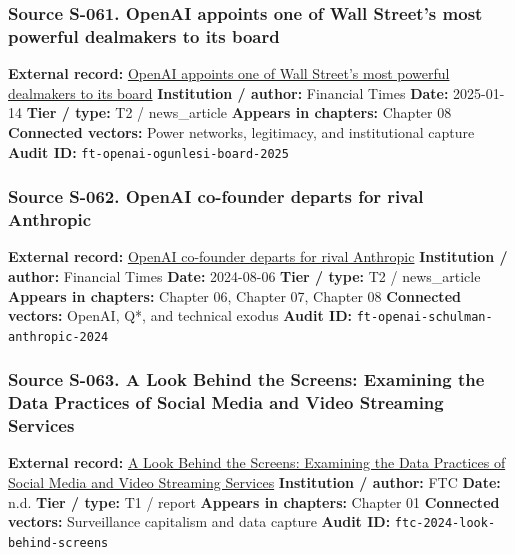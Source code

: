 \documentclass[
  american,
  11pt,
  letterpaper,
]{article}
\begin{document}
\subsubsection{Source S-061. OpenAI appoints one of Wall Street's most
powerful dealmakers to its
board}\label{source-s-061-openai-appoints-one-of-wall-street-s-most-powerful-dealmakers-to-its-board}

\textbf{External record:}
\href{https://www.ft.com/content/63b08a9d-e537-4d60-9904-c59958a16982}{OpenAI
appoints one of Wall Street's most powerful dealmakers to its board}
\textbf{Institution / author:} Financial Times \textbf{Date:} 2025-01-14
\textbf{Tier / type:} T2 / news\_article \textbf{Appears in chapters:}
Chapter 08 \textbf{Connected vectors:} Power networks, legitimacy, and
institutional capture \textbf{Audit ID:}
\texttt{ft-openai-ogunlesi-board-2025}

\subsubsection{Source S-062. OpenAI co-founder departs for rival
Anthropic}\label{source-s-062-openai-co-founder-departs-for-rival-anthropic}

\textbf{External record:}
\href{https://www.ft.com/content/4135d3c0-576a-4964-b79b-4242f8cb2471}{OpenAI
co-founder departs for rival Anthropic} \textbf{Institution / author:}
Financial Times \textbf{Date:} 2024-08-06 \textbf{Tier / type:} T2 /
news\_article \textbf{Appears in chapters:} Chapter 06, Chapter 07,
Chapter 08 \textbf{Connected vectors:} OpenAI, Q*, and technical exodus
\textbf{Audit ID:} \texttt{ft-openai-schulman-anthropic-2024}

\subsubsection{Source S-063. A Look Behind the Screens: Examining the
Data Practices of Social Media and Video Streaming
Services}\label{source-s-063-a-look-behind-the-screens-examining-the-data-practices-of-social-media-and-video-streaming-services}

\textbf{External record:}
\href{https://www.ftc.gov/reports/look-behind-screens-examining-data-practices-social-media-video-streaming-services}{A
Look Behind the Screens: Examining the Data Practices of Social Media
and Video Streaming Services} \textbf{Institution / author:} FTC
\textbf{Date:} n.d. \textbf{Tier / type:} T1 / report \textbf{Appears in
chapters:} Chapter 01 \textbf{Connected vectors:} Surveillance
capitalism and data capture \textbf{Audit ID:}
\texttt{ftc-2024-look-behind-screens}
\end{document}
